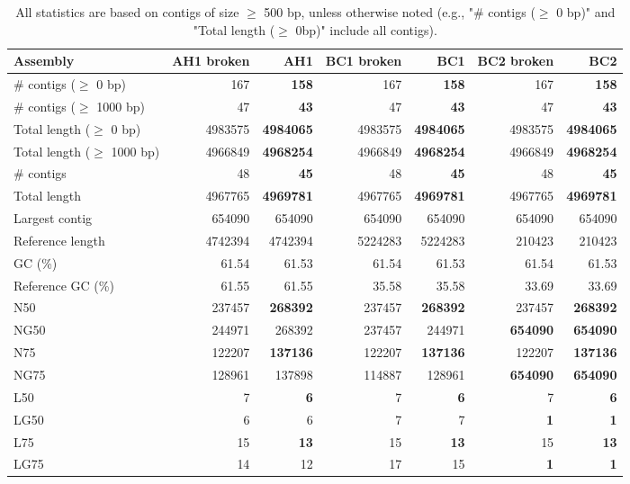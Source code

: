 \documentclass[12pt,a4paper]{article}
\begin{document}
\begin{table}[ht]
\begin{center}
\caption{All statistics are based on contigs of size $\geq$ 500 bp, unless otherwise noted (e.g., "\# contigs ($\geq$ 0 bp)" and "Total length ($\geq$ 0bp)" include all contigs).}
\begin{tabular}{|l*{6}{|r}|}
\hline
Assembly & AH1 broken & AH1 & BC1 broken & BC1 & BC2 broken & BC2 \\ \hline
\# contigs ($\geq$ 0 bp) & 167 & {\bf 158} & 167 & {\bf 158} & 167 & {\bf 158} \\ \hline
\# contigs ($\geq$ 1000 bp) & 47 & {\bf 43} & 47 & {\bf 43} & 47 & {\bf 43} \\ \hline
Total length ($\geq$ 0 bp) & 4983575 & {\bf 4984065} & 4983575 & {\bf 4984065} & 4983575 & {\bf 4984065} \\ \hline
Total length ($\geq$ 1000 bp) & 4966849 & {\bf 4968254} & 4966849 & {\bf 4968254} & 4966849 & {\bf 4968254} \\ \hline
\# contigs & 48 & {\bf 45} & 48 & {\bf 45} & 48 & {\bf 45} \\ \hline
Total length & 4967765 & {\bf 4969781} & 4967765 & {\bf 4969781} & 4967765 & {\bf 4969781} \\ \hline
Largest contig & 654090 & 654090 & 654090 & 654090 & 654090 & 654090 \\ \hline
Reference length & 4742394 & 4742394 & 5224283 & 5224283 & 210423 & 210423 \\ \hline
GC (\%) & 61.54 & 61.53 & 61.54 & 61.53 & 61.54 & 61.53 \\ \hline
Reference GC (\%) & 61.55 & 61.55 & 35.58 & 35.58 & 33.69 & 33.69 \\ \hline
N50 & 237457 & {\bf 268392} & 237457 & {\bf 268392} & 237457 & {\bf 268392} \\ \hline
NG50 & 244971 & 268392 & 237457 & 244971 & {\bf 654090} & {\bf 654090} \\ \hline
N75 & 122207 & {\bf 137136} & 122207 & {\bf 137136} & 122207 & {\bf 137136} \\ \hline
NG75 & 128961 & 137898 & 114887 & 128961 & {\bf 654090} & {\bf 654090} \\ \hline
L50 & 7 & {\bf 6} & 7 & {\bf 6} & 7 & {\bf 6} \\ \hline
LG50 & 6 & 6 & 7 & 7 & {\bf 1} & {\bf 1} \\ \hline
L75 & 15 & {\bf 13} & 15 & {\bf 13} & 15 & {\bf 13} \\ \hline
LG75 & 14 & 12 & 17 & 15 & {\bf 1} & {\bf 1} \\ \hline

\end{tabular}
\end{center}
\end{table}
\end{document}
